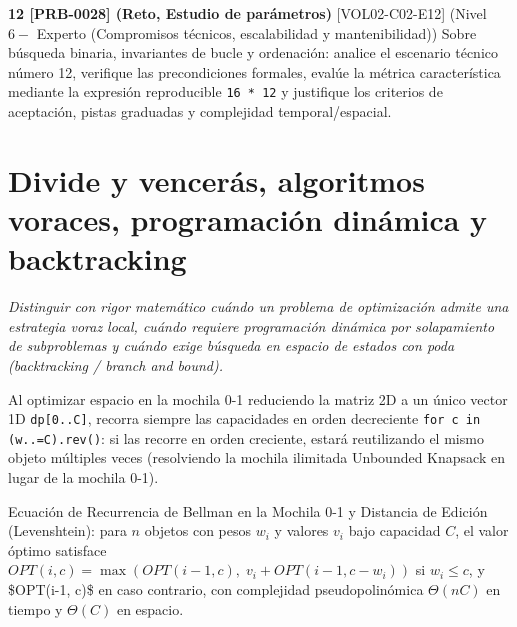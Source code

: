 \documentclass{book}
\begin{document}
\begin{tcolorbox}[title={Ejercicios}, studiumworked, breakable]
\noindent\textbf{12 [PRB-0028] (Reto, Estudio de parámetros)}
[VOL02-C02-E12] (Nivel \(6 -\) Experto (Compromisos técnicos, escalabilidad y mantenibilidad)) Sobre búsqueda binaria, invariantes de bucle y ordenación: analice el escenario técnico número 12, verifique las precondiciones formales, evalúe la métrica característica mediante la expresión reproducible \texttt{16 * 12} y justifique los criterios de aceptación, pistas graduadas y complejidad temporal/espacial.
\end{tcolorbox}

\chapter{Divide y vencerás, algoritmos voraces, programación dinámica y backtracking}
\label{chap:cap03-divide-venceras-voraces-programacion-dinamica}

\noindent\textit{Distinguir con rigor matemático cuándo un problema de optimización admite una estrategia voraz local, cuándo requiere programación dinámica por solapamiento de subproblemas y cuándo exige búsqueda en espacio de estados con poda (backtracking / branch and bound).}

\begin{tcolorbox}[title={Consejo}, studiumtip, breakable]

Al optimizar espacio en la mochila 0-1 reduciendo la matriz 2D a un único vector 1D \texttt{dp[0..C]}, recorra siempre las capacidades en orden decreciente \texttt{for c in (w..=C).rev()}: si las recorre en orden creciente, estará reutilizando el mismo objeto múltiples veces (resolviendo la mochila ilimitada Unbounded Knapsack en lugar de la mochila 0-1).
\end{tcolorbox}

\begin{tcolorbox}[title={Definición}, studiumdef, breakable]

Ecuación de Recurrencia de Bellman en la Mochila 0-1 y Distancia de Edición (Levenshtein): para \(n\) objetos con pesos \(w_i\) y valores \(v_i\) bajo capacidad \(C\), el valor óptimo satisface \(OPT(i, c) = \max(OPT(i-1, c),\; v_i + OPT(i-1, c - w_i))\) si \(w_i \le c\), y \$OPT(i-1, c)\$ en caso contrario, con complejidad pseudopolinómica \(\Theta(n C)\) en tiempo y \(\Theta(C)\) en espacio.
\end{tcolorbox}
\end{document}
